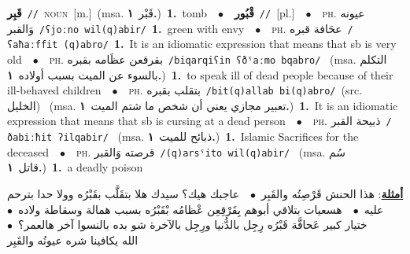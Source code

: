 \documentclass[10pt,a4paper,twoside]{article} %
\begin{document}
\begin{multicols}{2}
{\setlength\topsep{0pt}\textbf{\foreignlanguage{arabic}{قَبِر}}\ {\color{gray}\texttt{//}\color{black}}\ \textsc{noun}\ [m.]\ \color{gray}(msa. \foreignlanguage{arabic}{قَبْر}~\foreignlanguage{arabic}{\textbf{١.}})\color{black}\ \textbf{1.}~tomb\ \ $\bullet$\ \ \setlength\topsep{0pt}\textbf{\foreignlanguage{arabic}{قْبُور}}\ {\color{gray}\texttt{//}\color{black}}\ [pl.]\ \ $\bullet$\ \ \textsc{ph.} \color{gray} \foreignlanguage{arabic}{عيونه وَالقبر}\color{black}\ {\color{gray}\texttt{/{\sffamily ʕjoːno wil(q)abir}/}\color{black}}\ \textbf{1.}~green with envy\ \ $\bullet$\ \ \textsc{ph.} \color{gray} \foreignlanguage{arabic}{عحَافة قبره}\color{black}\ {\color{gray}\texttt{/{\sffamily ʕaħaːffit (q)abro}/}\color{black}}\ \textbf{1.}~It is an idiomatic expression that means that sb is very old\ \ $\bullet$\ \ \textsc{ph.} \color{gray} \foreignlanguage{arabic}{بقرقعن عظَامه بقبره}\color{black}\ {\color{gray}\texttt{/{\sffamily biqarqiʕin ʕðˤaːmo bqabro}/}\color{black}}\ \color{gray} (msa. \foreignlanguage{arabic}{التكلم بالسوء عن الميت بسبب أولاده}~\foreignlanguage{arabic}{\textbf{١.}})\color{black}\ \textbf{1.}~to speak ill of dead people because of their ill-behaved children\ \ $\bullet$\ \ \textsc{ph.} \color{gray} \foreignlanguage{arabic}{بتقلب بقبره}\color{black}\ {\color{gray}\texttt{/{\sffamily bit(q)allab bi(q)abro}/}\color{black}}\ \color{gray}(src. \foreignlanguage{arabic}{الخليل})\color{black}\ \color{gray} (msa. \foreignlanguage{arabic}{تعبير مجازي يعني أن شخص ما شتم الميت}~\foreignlanguage{arabic}{\textbf{١.}})\color{black}\ \textbf{1.}~It is an idiomatic expression that means that sb is cursing at a dead person\ \ $\bullet$\ \ \textsc{ph.} \color{gray} \foreignlanguage{arabic}{ذبيحة القبر}\color{black}\ {\color{gray}\texttt{/{\sffamily ðabiːħit ʔilqabir}/}\color{black}}\ \color{gray} (msa. \foreignlanguage{arabic}{ذبائح للميت}~\foreignlanguage{arabic}{\textbf{١.}})\color{black}\ \textbf{1.}~Islamic Sacrifices for the deceased\ \ $\bullet$\ \ \textsc{ph.} \color{gray} \foreignlanguage{arabic}{قرصته وَالقبر}\color{black}\ {\color{gray}\texttt{/{\sffamily (q)arsˤito wil(q)abir}/}\color{black}}\ \color{gray} (msa. \foreignlanguage{arabic}{سُم قاتل}~\foreignlanguage{arabic}{\textbf{١.}})\color{black}\ \textbf{1.}~a deadly poison\  \begin{flushright}\color{gray}\foreignlanguage{arabic}{\textbf{\underline{\foreignlanguage{arabic}{أمثلة}}}: هذا الحنش قَرْصِتُه والقَبِر\ $\bullet$\ \  عاجبك هيك؟ سيدك هلا بتقَلَّب بقَبْرُه وولا حدا بترحم عليه\ $\bullet$\ \  هسعيات بتلاقي أبوهم بِقَرْقِعِن عْظامُه بْقَبْرُه بسبب همالة وسقاطة ولاده\ $\bullet$\ \  ختيار كبير عَحافَّة قَبْرُه رِجِل بالدُّنيا ورِجِل بالآخرة شو بده بالنسوا آخر هالعمر؟\ $\bullet$\ \  الله يكافينا شره عيونُه والقَبِر}\end{flushright}\color{black}} \vspace{2mm}


\end{multicols}
\end{document}

